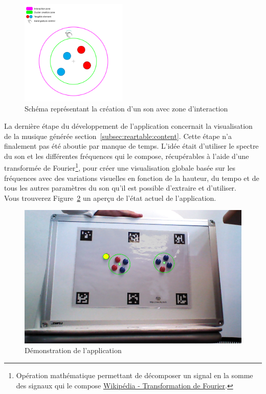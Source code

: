\begin{figure}[H]
\centering
\includegraphics[width=0.45\textwidth]{images/reartable_cluster_interaction}
\caption{Schéma représentant la création d'un son avec zone d'interaction}
\label{fig:reartable:interactionzone}
\end{figure}

La dernière étape du développement de l'application concernait la visualisation de la musique générée section~\ref{subsec:reartable:content}. Cette étape n'a finalement pas été aboutie par manque de temps. L'idée était d'utiliser le spectre du son et les différentes fréquences qui le compose, récupérables à l'aide d'une transformée de Fourier\footnote{Opération mathématique permettant de décomposer un signal en la somme des signaux qui le compose \href{https://fr.wikipedia.org/wiki/Transformation_de_Fourier}{Wikipédia - Transformation de Fourier}.}, pour créer une visualisation globale basée sur les fréquences avec des variations visuelles en fonction de la hauteur, du tempo et de tous les autres paramètres du son qu'il est possible d'extraire et d'utiliser.\\

Vous trouverez Figure~\ref{fig:reartable:demo} un aperçu de l'état actuel de l'application. 

\begin{figure}[H]
\centering
\includegraphics[width=0.65\linewidth]{images/reartable}
\caption{Démonstration de l'application}
\label{fig:reartable:demo}
\end{figure}

